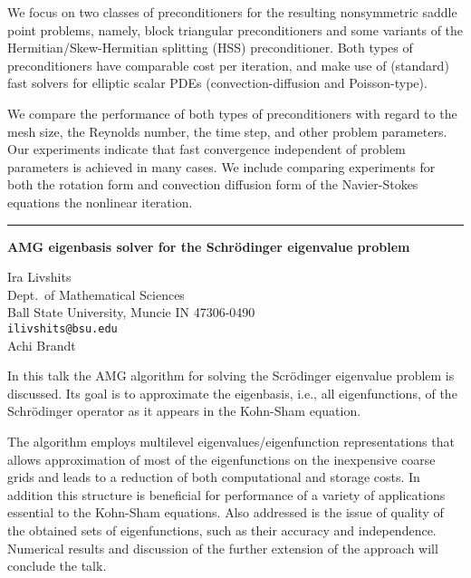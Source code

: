 \documentclass[twosided]{report}
\begin{document}
We focus on two classes of
preconditioners for the resulting nonsymmetric saddle point
problems, namely, block triangular preconditioners and some
variants of the Hermitian/Skew-Hermitian splitting (HSS)
preconditioner. Both types of preconditioners have
comparable cost per iteration, and make use of (standard)
fast solvers for elliptic scalar PDEs (convection-diffusion
and Poisson-type).

We compare the performance of both
types of preconditioners with regard to the mesh size, the
Reynolds number, the time step, and other problem
parameters. Our experiments indicate that fast convergence
independent of problem parameters is achieved in many cases.
We include comparing experiments for both the rotation form
and convection diffusion form of the Navier-Stokes equations
the nonlinear iteration.



	\begin{center} \rule{6in}{1pt} \end{center}

\begin{center}
{\large			%
{\bf AMG eigenbasis solver for the Schr\"{o}dinger eigenvalue problem}}

	Ira Livshits \\
	Dept.~of Mathematical Sciences \\
	Ball State University, Muncie IN 47306-0490 \\
	{\tt ilivshits@bsu.edu} \\
	Achi Brandt
\end{center}
In this talk the AMG algorithm for solving the
Scr\"{o}dinger eigenvalue problem is discussed. Its goal is
to approximate the eigenbasis, i.e., all eigenfunctions, of
the Schr\"{o}dinger operator as it appears in the Kohn-Sham
equation.

The algorithm employs multilevel
eigenvalues/eigenfunction representations that allows
approximation of most of the eigenfunctions on the
inexpensive coarse grids and leads to a reduction of both
computational and storage costs. In addition this structure
is beneficial for performance of a variety of applications
essential to the Kohn-Sham equations. Also addressed is the
issue of quality of the obtained sets of eigenfunctions,
such as their accuracy and independence. Numerical results
and discussion of the further extension of the approach will
conclude the talk.
\end{document}
